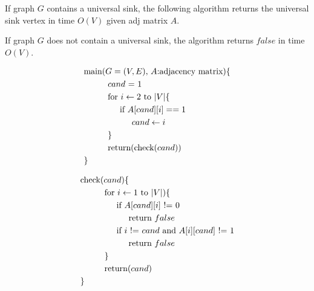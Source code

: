 \documentclass[a4paper]{report}
\begin{document}
\begin{enumerate}
      If graph $G$ contains a universal sink, the following algorithm 
      returns the universal sink vertex in time $O(V)$ given adj matrix $A$.

      If graph $G$ does not contain a universal sink, the algorithm returns $false$ in time $O(V)$.

      \begin{align*}
        & \text{main($G=(V,E)$, $A$:adjacency matrix)\{} \\
        & \hspace{1cm} \text{$cand$ = 1} \\
        & \hspace{1cm} \text{for $i \leftarrow 2$ to $|V|$\{ } \\
        & \hspace{1.5cm} \text{if $A[cand][i] == 1$}   \\
        & \hspace{2cm} \text{$cand \leftarrow i$}   \\
        & \hspace{1cm} \text{\}}   \\
        & \hspace{1cm} \text{return(check($cand$))} \\
        &\text{\}} \\
      \end{align*}

      \begin{align*}
        & \text{check($cand$)\{} \\
        & \hspace{1cm} \text{for $i \leftarrow 1$ to $|V|$)\{ } \\
        & \hspace{1.5cm} \text{if $A[cand][i]$ != $0$}   \\
        & \hspace{2cm} \text{return $false$}   \\
        & \hspace{1.5cm} \text{if $i$ != $cand$ and $A[i][cand]$ != $1$}   \\
        & \hspace{2cm} \text{return $false$}   \\
        & \hspace{1cm} \text{\}}   \\
        & \hspace{1cm} \text{return($cand$)} \\
        &\text{\}} \\
      \end{align*}


\end{enumerate}
\end{document}
